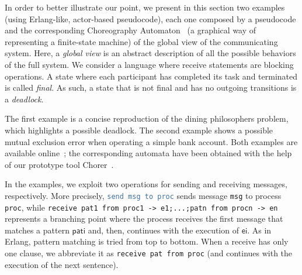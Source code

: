 In order to better illustrate our point, we present in this section two examples (using Erlang-like, actor-based pseudocode), each one
composed by a pseudocode and the corresponding Choreography
Automaton~\cite{coordination2020-chorAuto} (a graphical way of
representing a finite-state machine) of the global view of the
communicating system. Here, a \emph{global view} is an abstract description of
all the possible behaviors of the full system. We consider a language
where receive statements are blocking operations. A state where each
participant has completed its task and terminated is called \emph{final}. As such, a
state that is not final and has no outgoing transitions is a \emph{deadlock}.

The first example is a concise reproduction of the dining philosophers
problem, which highlights a possible deadlock. The second example
shows a possible mutual exclusion error 
when operating a simple bank account.
%
Both examples are available online~\cite{chorer_examples}; the
corresponding automata have been obtained with the help of our prototype tool
Chorer~\cite{chorer}.



In the examples, we exploit two operations for sending and receiving messages,
respectively.
%
More precisely, \lstinline[language=erlang, morekeywords={send,
  to}]{send msg to proc} sends message \lstinline{msg} to process
\lstinline{proc}, while \lstinline[morekeywords={receive,
  from}]{receive pat1 from proc1 -> e1;...;patn from procn -> en} 
  represents a branching point where the process receives 
  the first message 
  that matches a pattern $\mathsf{pati}$ and, then, 
  continues with the execution of $\mathsf{ei}$. 
  As in Erlang, 
pattern matching is tried from top to bottom.
When a receive has only one clause, we abbreviate it as
\lstinline[morekeywords={receive,from}]{receive pat from proc}
(and continues with the execution of the next sentence).